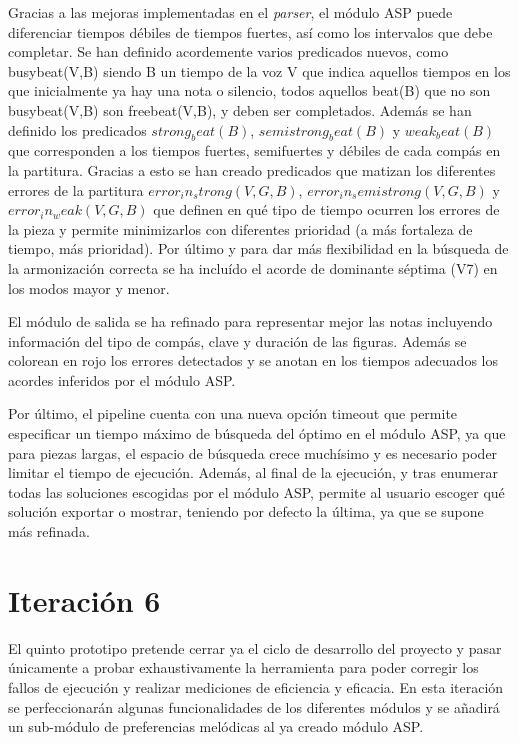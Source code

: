 Gracias a las mejoras implementadas en el \textit{parser}, el módulo ASP puede diferenciar tiempos débiles de tiempos fuertes, así como los intervalos que debe completar. Se han definido acordemente varios predicados nuevos, como busybeat(V,B) siendo B un tiempo de la voz V que indica aquellos tiempos en los que inicialmente ya hay una nota o silencio, todos aquellos beat(B) que no son busybeat(V,B) son freebeat(V,B), y deben ser completados. Además se han definido los predicados $strong_beat(B)$, $semistrong_beat(B)$ y $weak_beat(B)$ que corresponden a los tiempos fuertes, semifuertes y débiles de cada compás en la partitura. Gracias a esto se han creado predicados que matizan los diferentes errores de la partitura $error_in_strong(V,G,B)$, $error_in_semistrong(V,G,B)$ y $error_in_weak(V,G,B)$ que definen en qué tipo de tiempo ocurren los errores de la pieza y permite minimizarlos con diferentes prioridad (a más fortaleza de tiempo, más prioridad). Por último y para dar más flexibilidad en la búsqueda de la armonización correcta se ha incluído el acorde de dominante séptima (V7) en los modos mayor y menor.

El módulo de salida se ha refinado para representar mejor las notas incluyendo información del tipo de compás, clave y duración de las figuras. Además se colorean en rojo los errores detectados y se anotan en los tiempos adecuados los acordes inferidos por el módulo ASP.

Por último, el pipeline cuenta con una nueva opción timeout que permite especificar un tiempo máximo de búsqueda del óptimo en el módulo ASP, ya que para piezas largas, el espacio de búsqueda crece muchísimo y es necesario poder limitar el tiempo de ejecución. Además, al final de la ejecución, y tras enumerar todas las soluciones escogidas por el módulo ASP, permite al usuario escoger qué solución exportar o mostrar, teniendo por defecto la última, ya que se supone más refinada.

\section{Iteración 6}
El quinto prototipo pretende cerrar ya el ciclo de desarrollo del proyecto y pasar únicamente a probar exhaustivamente la herramienta para poder corregir los fallos de ejecución y realizar mediciones de eficiencia y eficacia. En esta iteración se perfeccionarán algunas funcionalidades de los diferentes módulos y se añadirá un sub-módulo de preferencias melódicas al ya creado módulo ASP.


